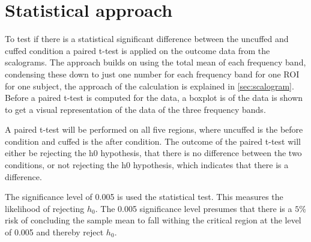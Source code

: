 \section{Statistical approach}
To test if there is a statistical significant difference between the uncuffed and cuffed condition a paired t-test is applied on the outcome data from the scalograms. The approach builds on using the total mean of each frequency band, condensing these down to just one number for each frequency band for one ROI for one subject, the approach of the calculation is explained in \ref{sec:scalogram}. 
Before a paired t-test is computed for the data, a boxplot is of the data is shown to get a visual representation of the data of the three frequency bands. 

A paired t-test will be performed on all five regions, where uncuffed is the before condition and cuffed is the after condition. The outcome of the paired t-test will either be rejecting the h0 hypothesis, that there is no difference between the two conditions, or not rejecting the h0 hypothesis, which indicates that there is a difference.

The significance level of 0.005 is used the statistical test. This measures the likelihood of rejecting $h_0$. The 0.005 significance level presumes that there is a $5\%$ risk of concluding the sample mean to fall withing the critical region at the level of 0.005 and thereby reject $h_0$. \cite{zar2014}
